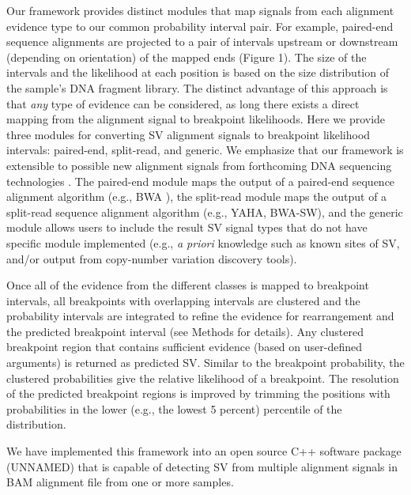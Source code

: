 \documentclass[11pt]{article}
\begin{document}
Our framework provides distinct modules that map signals from each alignment 
evidence type to our common probability interval pair.  For example, paired-end 
sequence alignments are projected to a pair of intervals upstream or downstream 
(depending on orientation) of the mapped ends (Figure 1).  The size of the 
intervals and the likelihood at each position is based on the size distribution
of the sample's DNA fragment library.  The distinct advantage of this approach
is that \emph{any} type of evidence can be considered, as long there exists
a direct mapping from the alignment signal to breakpoint likelihoods.
Here we provide three modules for converting SV alignment signals to breakpoint
likelihood intervals: paired-end, split-read, and generic.  We emphasize that
our framework is extensible to possible new alignment signals from forthcoming
DNA sequencing technologies \cite{OxfordNanopore}. The paired-end module maps 
the output of a paired-end sequence alignment algorithm 
(e.g., BWA \cite{li2009a}), the split-read module maps the output of a 
split-read sequence alignment algorithm (e.g., YAHA\cite{faust2012}, 
BWA-SW\cite{li2010}), and the generic module allows users to include the result 
SV signal types that do not have specific module implemented (e.g., 
\emph{a priori} knowledge such as known sites of SV, and/or output from 
copy-number variation discovery tools).

Once all of the evidence from the different classes is mapped to breakpoint
intervals, all breakpoints with overlapping intervals are clustered and 
the probability intervals are integrated to refine the evidence for 
rearrangement and the predicted breakpoint interval (see Methods for details).  
Any clustered breakpoint region that contains sufficient evidence (based on 
user-defined arguments) is returned as predicted SV.  
Similar to the breakpoint probability, the clustered probabilities give the 
relative likelihood of a breakpoint.  The resolution of the predicted breakpoint
regions is improved by trimming the positions with probabilities 
in the lower (e.g., the lowest 5 percent) percentile of the distribution.

We have implemented this framework into an open source C++ software package 
(UNNAMED) that is capable of detecting SV from multiple alignment signals in 
BAM alignment file from one or more samples.
\end{document}
